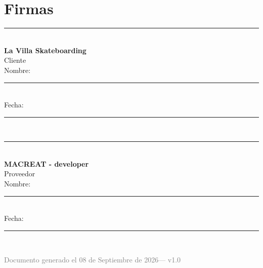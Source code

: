 \documentclass[11pt,a4paper]{article}
\newcommand{\apiversion}{v1.0}
\newcommand{\docdate}{08 de Septiembre de 2026}
\begin{document}
\newpage
\section{Firmas}

\vspace{2cm}

\begin{minipage}{0.45\textwidth}
\begin{center}
\rule{6cm}{0.5pt}\\[0.5cm]
\textbf{La Villa Skateboarding}\\
Cliente\\[0.3cm]
Nombre: \rule{5cm}{0.3pt}\\[0.3cm]
Fecha: \rule{5cm}{0.3pt}\\
\end{center}
\end{minipage}
\hfill
\begin{minipage}{0.45\textwidth}
\begin{center}
\rule{6cm}{0.5pt}\\[0.5cm]
\textbf{MACREAT - developer}\\
Proveedor\\[0.3cm]
Nombre: \rule{5cm}{0.3pt}\\[0.3cm]
Fecha: \rule{5cm}{0.3pt}\\
\end{center}
\end{minipage}

\vfill

\begin{center}
\textcolor{gray}{\small Documento generado el \docdate --- \apiversion}
\end{center}
\end{document}
